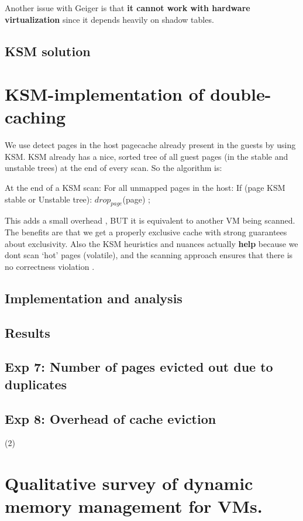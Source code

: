 \documentclass[10pt,a4paper]{article}
\begin{document}
Another issue with Geiger is that \textbf{it cannot work with hardware virtualization} since it depends heavily on shadow tables. 

\subsection{KSM solution}

    
\section{KSM-implementation of double-caching}


We use detect pages in the host pagecache already present in the guests by               using KSM. 
KSM already has a nice, sorted tree of all guest pages (in the stable and unstable trees) 
at the end of every scan. So the algorithm is: 

At the end of a  KSM scan: 
   For all unmapped pages in the host: 
       If (page \in KSM stable or Unstable tree): 
          $drop_{page}$(page) ; 
 

This adds a small overhead , BUT it is equivalent to another VM being scanned. 
The benefits are that we get a properly exclusive cache with strong guarantees 
about exclusivity. Also the KSM heuristics and nuances actually \textbf{help} because 
we dont scan `hot' pages (volatile), and the scanning approach ensures that 
there is no correctness violation .

\subsection{Implementation and analysis}

\subsection{Results}


\subsection{Exp 7: Number of pages evicted out due to duplicates}

\subsection{Exp 8: Overhead of cache eviction}

   (2)
\section{Qualitative survey of dynamic memory management for VMs.}
\end{document}

